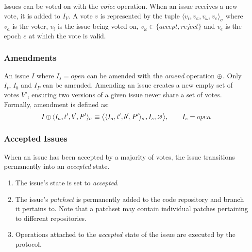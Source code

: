 Issues can be voted on with the \emph{voice} operation. When an issue receives
a new vote, it is added to $I_V$. A vote $v$ is represented by the tuple
$\langle v_i, v_a, v_{\omega}, v_e \rangle_{\sigma}$ where $v_a$ is the voter,
$v_i$ is the issue being voted on, $v_{\omega} \in \{accept, reject\}$ and
$v_e$ is the epoch $e$ at which the vote is valid.

\subsubsection{Amendments}

An issue $I$ where $I_s = open$ can be amended with the \emph{amend} operation
$\operatorname{\oplus}$. Only $I_t$, $I_b$ and $I_P$ can be amended.  Amending an issue creates
a new empty set of votes $V'$, ensuring two versions of a given issue never
share a set of votes. Formally, amendment is defined as:
\begin{align*}
    I \operatorname{\oplus}{} \langle I_a, t', b', P' \rangle_{\sigma} \equiv \big<\langle I_a, t', b', P'
    \rangle_{\sigma}, I_s, \varnothing \big>, \qquad I_s = open
\end{align*}

\subsubsection{Accepted Issues} When an issue has been accepted by a majority
of votes, the issue transitions permanently into an \emph{accepted} state.

\begin{enumerate}
    \item The issue's state is set to \emph{accepted}.
    \item The issue's \emph{patchset} is permanently added to the code
        repository and branch it pertains to. Note that a patchset may contain
        individual patches pertaining to different repositories.
    \item Operations attached to the \emph{accepted} state of the issue are
        executed by the protocol.
\end{enumerate}
